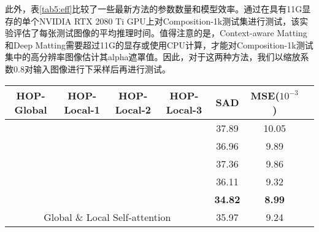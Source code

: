 此外，表\ref{tab5:eff}比较了一些最新方法的参数数量和模型效率。通过在具有11G显存的单个NVIDIA RTX 2080 Ti GPU上对Composition-1k测试集进行测试，该实验评估了每张测试图像的平均推理时间。值得注意的是，Context-aware Matting\cite{hou2019context}和Deep Matting\cite{xu2017deep}需要超过11G的显存或使用CPU计算，才能对Composition-1k测试集中的高分辨率图像估计其alpha遮罩值。因此，对于这两种方法，我们以缩放系数0.8对输入图像进行下采样后再进行测试。

\begin{table}[t]
	\setlength{\tabcolsep}{8pt}
	\centering
	\begin{tabular}{cccc|ccc}  
		\toprule
		HOP-Global &HOP-Local-1 &HOP-Local-2 &HOP-Local-3& SAD& MSE($10^{-3}$) \\%
		\midrule
		&&& & 37.89  & 10.05   \\%
		\checkmark&&& & 36.96 & 9.89  \\%
		\checkmark&\checkmark&&& 37.36  & 9.86 \\%
		\checkmark&\checkmark&\checkmark& & 36.11 & 9.32 \\%
		\checkmark&\checkmark&\checkmark&\checkmark& \textbf{34.82} & \textbf{8.99}\\%
		\midrule
		\multicolumn{4}{c|}{Global \& Local Self-attention}&  35.97 & 9.24 \\%
		\bottomrule
	\end{tabular}
	\label{tab5:block}
\end{table}


